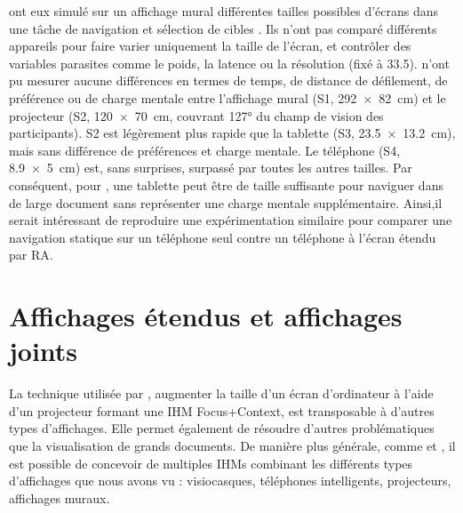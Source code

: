 \cite{Raedle2014} ont eux simulé sur un affichage mural différentes tailles possibles d'écrans  dans une tâche de navigation et sélection de cibles . Ils n'ont pas comparé différents appareils pour faire varier uniquement la taille de l'écran, et contrôler des variables parasites comme le poids, la latence ou la résolution (fixé à \SI{33.5}{\ppi}). \citeauthor{Raedle2014} n'ont pu mesurer aucune différences en termes de temps, de distance de défilement, de préférence ou de charge mentale entre l'affichage mural (S1, \SI{292x82}{\cm}) et le projecteur (S2, \SI{120x70}{\cm}, couvrant \ang{127} du champ de vision des participants). S2 est légèrement plus rapide que la tablette (S3, \SI{23.5x13.2}{\cm}), mais sans différence de préférences et charge mentale. Le téléphone (S4, \SI{8.9x5}{\cm}) est, sans surprises, surpassé par toutes les autres tailles. Par conséquent, pour \citeauthor{Raedle2014}, une tablette peut être de taille suffisante pour naviguer dans de large document sans représenter une charge mentale supplémentaire. Ainsi,il serait intéressant de reproduire une expérimentation similaire pour comparer une navigation statique sur un téléphone seul contre un téléphone à l'écran étendu par RA.


\section{Affichages étendus et affichages joints}
\label{subsec:litterature_extended_screens}

La technique utilisée par \cite{Baudisch2002}, augmenter la taille d'un écran d'ordinateur à l'aide d'un projecteur formant une IHM Focus+Context, est transposable à d'autres types d'affichages. Elle permet également de résoudre d'autres problématiques que la visualisation de grands documents. De manière plus générale, comme \cite{Grubert2015} et \cite{Serrano2015}, il est possible de concevoir de multiples IHMs combinant les différents types d'affichages que nous avons vu : visiocasques, téléphones intelligents, projecteurs, affichages muraux.


